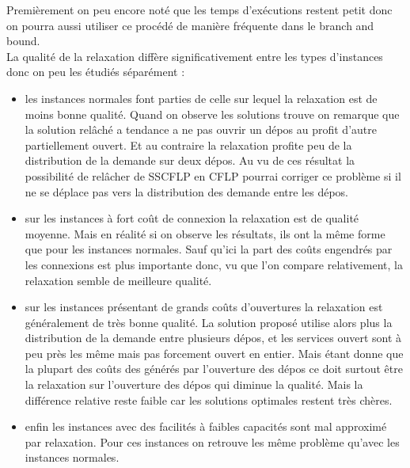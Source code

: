 \documentclass[12pt,a4paper]{article}
\begin{document}
Premièrement on peu encore noté que les temps d’exécutions restent petit donc on pourra aussi utiliser ce procédé de manière fréquente dans le branch and bound.\\

La qualité de la relaxation diffère significativement entre les types d'instances donc on peu les étudiés séparément :
\begin{itemize}
\item
les instances normales font parties de celle sur lequel la relaxation est de moins bonne qualité. Quand on observe les solutions trouve on remarque que la solution relâché a tendance a ne pas ouvrir un dépos au profit d'autre partiellement ouvert. Et au contraire la relaxation profite peu de la distribution de la demande sur deux dépos. Au vu de ces résultat la possibilité de relâcher de SSCFLP en CFLP pourrai corriger ce problème si il ne se déplace pas vers  la distribution des demande entre les dépos.
\item
sur les instances à fort coût de connexion la relaxation est de qualité moyenne. Mais en réalité si on observe les résultats, ils ont la même forme que pour les instances normales. Sauf qu'ici la part des coûts engendrés par les connexions est plus importante donc, vu que l'on compare relativement, la relaxation semble de meilleure qualité.
\item
sur les instances présentant de grands coûts d'ouvertures la relaxation est généralement de très bonne qualité. La solution proposé utilise alors plus la distribution de la demande entre plusieurs dépos, et les services ouvert sont à peu près les même mais pas forcement ouvert en entier. Mais étant donne que la plupart des coûts des générés par l’ouverture des dépos ce doit surtout être la relaxation sur l’ouverture des dépos qui diminue la qualité. Mais la différence relative reste faible car les solutions optimales restent très chères.
\item
enfin les instances avec des facilités à faibles capacités sont mal approximé par relaxation. Pour ces instances on retrouve les même problème qu'avec les instances normales. 
\end{itemize}
\end{document}
